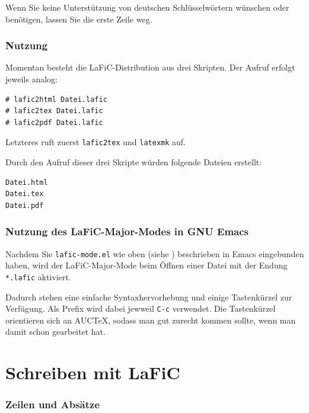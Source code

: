 \documentclass{scrartcl}
\begin{document}
{Wenn Sie keine Unterstützung von deutschen Schlüsselwörtern
wünschen oder benötigen, lassen Sie die erste Zeile weg.\\}

\section{Nutzung}

{Momentan besteht die LaFiC-Distribution aus drei
Skripten. Der Aufruf erfolgt jeweils analog:\\}

\begin{verbatim}
# lafic2html Datei.lafic
# lafic2tex Datei.lafic
# lafic2pdf Datei.lafic
\end{verbatim}


{Letzteres ruft zuerst \texttt{lafic2tex} und \texttt{latexmk} auf.\\}

{Durch den Aufruf dieser drei Skripte würden folgende Dateien
erstellt:\\}

\begin{verbatim}
Datei.html
Datei.tex
Datei.pdf
\end{verbatim}


\section{Nutzung des LaFiC-Major-Modes in GNU Emacs}

{Nachdem Sie \texttt{lafic-mode.el} wie oben (siehe \xspace )
beschrieben in Emacs eingebunden haben, wird der
LaFiC-Major-Mode beim Öffnen einer Datei mit der Endung
\texttt{*.lafic} aktiviert.\\}

{Dadurch stehen eine einfache Syntaxhervorhebung und einige
Tastenkürzel zur Verfügung. Als Prefix wird dabei jewweil
\texttt{C-c} verwendet. Die Tastenkürzel orientieren sich an AUCTeX,
sodass man gut zurecht kommen sollte, wenn man damit schon
gearbeitet hat.\\}

\part{Schreiben mit LaFiC}

\section{Zeilen und Absätze}
\end{document}
